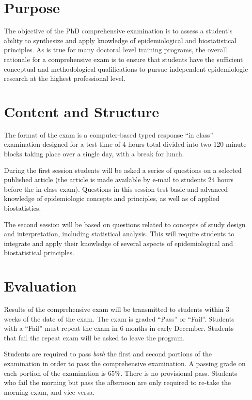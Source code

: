 \documentclass[
  letterpaper,
  DIV=11,
  numbers=noendperiod]{scrreprt}
\begin{document}
\section{Purpose}\label{purpose}

The objective of the PhD comprehensive examination is to assess a
student's ability to synthesize and apply knowledge of epidemiological
and biostatistical principles. As is true for many doctoral level
training programs, the overall rationale for a comprehensive exam is to
ensure that students have the sufficient conceptual and methodological
qualifications to pursue independent epidemiologic research at the
highest professional level.

\section{Content and Structure}\label{content-and-structure}

The format of the exam is a computer-based typed response ``in class''
examination designed for a test-time of 4 hours total divided into two
120 minute blocks taking place over a single day, with a break for
lunch.

During the first session students will be asked a series of questions on
a selected published article (the article is made available by e-mail to
students 24 hours before the in-class exam). Questions in this session
test basic and advanced knowledge of epidemiologic concepts and
principles, as well as of applied biostatistics.

The second session will be based on questions related to concepts of
study design and interpretation, including statistical analysis. This
will require students to integrate and apply their knowledge of several
aspects of epidemiological and biostatistical principles.

\section{Evaluation}\label{evaluation}

Results of the comprehensive exam will be transmitted to students within
3 weeks of the date of the exam. The exam is graded ``Pass'' or
``Fail''. Students with a ``Fail'' must repeat the exam in 6 months in
early December. Students that fail the repeat exam will be asked to
leave the program.

Students are required to pass \emph{both} the first and second portions
of the examination in order to pass the comprehensive examination. A
passing grade on each portion of the examination is 65\%. There is no
provisional pass. Students who fail the morning but pass the afternoon
are only required to re-take the morning exam, and vice-versa.
\end{document}

